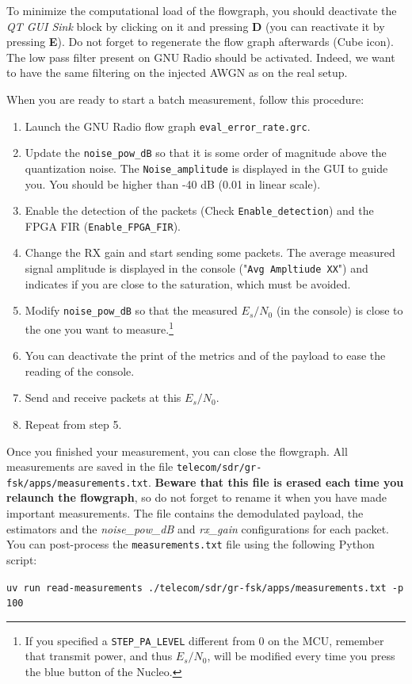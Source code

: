 To minimize the computational load of the flowgraph, you should deactivate the \textit{QT GUI Sink} block by clicking on it and pressing \textbf{D} (you can reactivate it by pressing \textbf{E}). Do not forget to regenerate the flow graph afterwards (Cube icon). The low pass filter present on GNU Radio should be activated. Indeed, we want to have the same filtering on the injected AWGN as on the real setup.

When you are ready to start a batch measurement, follow this procedure:
\begin{enumerate}
    \item Launch the GNU Radio flow graph \texttt{eval\_error\_rate.grc}.
    \item Update the \texttt{noise\_pow\_dB} so that it is some order of magnitude above the quantization noise. The \texttt{Noise\_amplitude} is displayed in the GUI to guide you. You should be higher than -40 dB (0.01 in linear scale).
    \item Enable the detection of the packets (Check \texttt{Enable\_detection}) and the FPGA FIR (\texttt{Enable\_FPGA\_FIR}).
    \item Change the RX gain and start sending some packets. The average measured signal amplitude is displayed in the console ("\texttt{Avg Ampltiude XX}") and indicates if you are close to the saturation, which must be avoided.
    \item Modify \texttt{noise\_pow\_dB} so that the measured $E_s/N_0$ (in the console) is close to the one you want to measure.\footnote[2]{If you specified a \texttt{STEP\_PA\_LEVEL} different from 0 on the MCU, remember that transmit power, and thus $E_s/N_0$, will be modified every time you press the blue button of the Nucleo.}
    \item You can deactivate the print of the metrics and of the payload to ease the reading of the console.
    \item Send and receive packets at this $E_s/N_0$.
    \item Repeat from step 5.
\end{enumerate}

Once you finished your measurement, you can close the flowgraph. All measurements are saved in the file \texttt{telecom/sdr/gr-fsk/apps/measurements.txt}. \textbf{Beware that this file is erased each time you relaunch the flowgraph}, so do not forget to rename it when you have made important measurements. The file contains the demodulated payload,  the estimators and the \textit{noise\_pow\_dB} and \textit{rx\_gain} configurations for each packet. You can post-process the \texttt{measurements.txt} file using the following Python script:
    \begin{center}
    \texttt{uv run read-measurements ./telecom/sdr/gr-fsk/apps/measurements.txt -p 100}\\
    \end{center}

